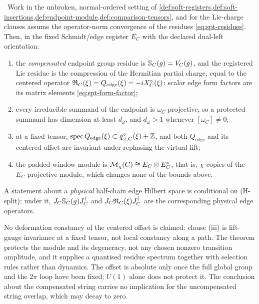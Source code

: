 \begin{theorem}\label{thm:edge-residue}
\statusProved\ Work in the unbroken, normal-ordered setting of
\cref{def:soft-registers,def:soft-insertions,def:endpoint-module,def:comparison-tensors},
and for the Lie-charge clauses assume the operator-norm convergence of the
residues \eqref{eq:spt-residues}. Then, in the fixed Schmidt/edge register
$E_C$ with the declared dual-left orientation:
\begin{enumerate}
\item the \emph{compensated} endpoint group residue is
  $\mathbb{S}_C(g)=V_C(g)$, and the registered Lie residue is the compression of
  the Hermitian partial charge, equal to the centered operator
  $\mathfrak{R}_C(\xi)=Q_{\mathrm{edge}}(\xi)=-iX^{\circ}_C(\xi)$; scalar edge
  form factors are its matrix elements
  \eqref{eq:spt-form-factor};
\item every irreducible summand of the endpoint is $\omega_C$-projective, so a
  protected summand has dimension at least $d_\omega$, and $d_\omega>1$
  whenever $[\omega_C]\ne0$;
\item at a fixed tensor, $\operatorname{spec} Q_{\mathrm{edge}}(\xi)\subset
  q^{\circ}_{\omega,C}(\xi)+\mathbb{Z}$, and both $Q_{\mathrm{edge}}$ and its centered
  offset are invariant under rephasing the virtual lift;
\item the padded-window module is
  $\mathcal{M}_\chi(C)\cong E_C\otimes E_C^{*}$, that is, $\chi$ copies of the
  $E_C$ projective module, which changes none of the bounds above.
\end{enumerate}
A statement about a \emph{physical} half-chain edge Hilbert space is
conditional on (H-split); under it, $J_C\mathbb{S}_C(g)J_C^{\dagger}$ and
$J_C\mathfrak{R}_C(\xi)J_C^{\dagger}$ are the corresponding physical edge
operators.
\end{theorem}

\begin{scope}
No deformation constancy of the centered offset is claimed: clause (iii) is
lift-gauge invariance at a fixed tensor, not local constancy along a path.
The theorem protects the module and its degeneracy, not any chosen nonzero
transition amplitude, and it supplies a quantised residue spectrum together
with selection rules rather than dynamics. The offset is absolute only once
the full global group and the $2\pi$ loop have been fixed; $U(1)$ alone does
not protect it. The conclusion about the compensated string carries no
implication for the uncompensated string overlap, which may decay to zero.
\end{scope}

